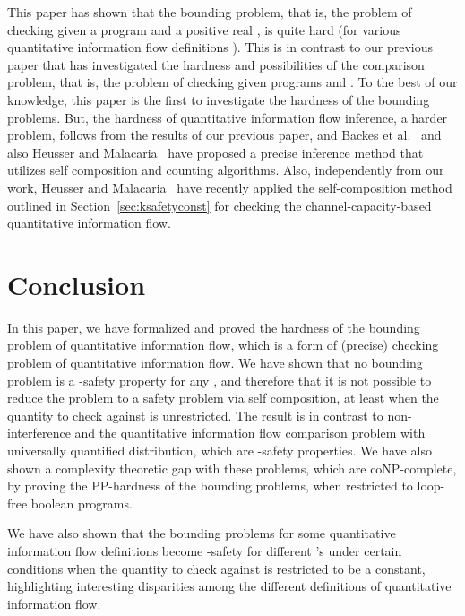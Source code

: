 \documentclass{llncs}
\begin{document}
This paper has shown that the bounding problem, that is, the problem
of checking  given a program  and a positive
real , is quite hard (for various quantitative information flow
definitions ).  This is in contrast to our previous paper
that has investigated the hardness and possibilities of the comparison
problem, that is, the problem of checking  given programs  and .  To the best of our
knowledge, this paper is the first to investigate the hardness of the
bounding problems.  But, the hardness of quantitative information flow
inference, a harder problem, follows from the results of our previous
paper, and Backes et al.~\cite{DBLP:conf/sp/BackesKR09} and also
Heusser and Malacaria~\cite{DBLP:conf/ifip1-7/HeusserM09} have
proposed a precise inference method that utilizes self composition and
counting algorithms.  Also, independently from our work, Heusser and
Malacaria~\cite{DBLP:conf/acsac/Heusser2010} have recently applied the
self-composition method outlined in Section~\ref{sec:ksafetyconst} for
checking the channel-capacity-based quantitative information flow.

\section{Conclusion}

\label{sec:concl}

In this paper, we have formalized and proved the hardness of the
bounding problem of quantitative information flow, which is a form of
(precise) checking problem of quantitative information flow.  We have
shown that no bounding problem is a -safety property for any ,
and therefore that it is not possible to reduce the problem to a
safety problem via self composition, at least when the quantity to
check against is unrestricted.  The result is in contrast to
non-interference and the quantitative information flow comparison
problem with universally quantified distribution, which are -safety
properties.  We have also shown a complexity theoretic gap with these
problems, which are coNP-complete, by proving the PP-hardness of the
bounding problems, when restricted to loop-free boolean programs.

We have also shown that the bounding problems for some quantitative
information flow definitions become -safety for different 's
under certain conditions when the quantity to check against is
restricted to be a constant, highlighting interesting disparities
among the different definitions of quantitative information flow.
\end{document}
